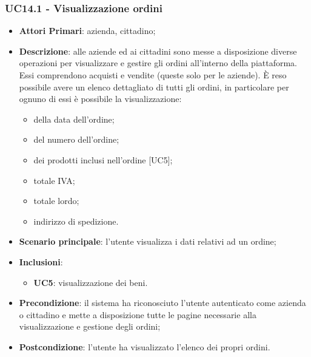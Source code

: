 \subsubsection{UC14.1 - Visualizzazione ordini}
\begin{itemize}
	\item \textbf{Attori Primari}: azienda, cittadino;
	\item \textbf{Descrizione}: alle aziende ed ai cittadini sono messe a disposizione diverse operazioni per visualizzare e gestire gli ordini all'interno della piattaforma. Essi comprendono acquisti e vendite (queste solo per le aziende). \`E reso possibile avere un elenco dettagliato di tutti gli ordini, in particolare per ognuno di essi è possibile la visualizzazione:
	\begin{itemize}
		\item della data dell'ordine;
		\item del numero dell'ordine;
		\item dei prodotti inclusi nell'ordine [UC5];
		\item totale IVA;
		\item totale lordo\glo;
		\item indirizzo di spedizione.
	\end{itemize}
	\item \textbf{Scenario principale}: l'utente visualizza i dati relativi ad un ordine;
	\item \textbf{Inclusioni}:
	\begin{itemize}
		\item \textbf{UC5}: visualizzazione dei beni.
	\end{itemize}
	\item \textbf{Precondizione}: il sistema ha riconosciuto l'utente autenticato come azienda o cittadino e mette a disposizione tutte le pagine necessarie alla visualizzazione e gestione degli ordini;
	\item \textbf{Postcondizione}: l'utente ha visualizzato l'elenco dei propri ordini.
\end{itemize} 



